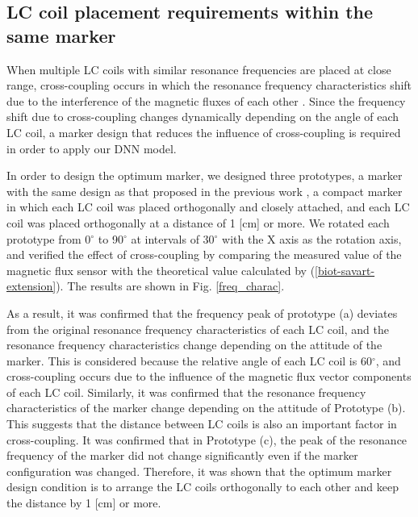 \documentclass[journal,twoside,web]{ieeecolor}
\begin{document}
\subsection{LC coil placement requirements within the same marker}
When multiple LC coils with similar resonance frequencies are placed at close range, cross-coupling occurs in which the resonance frequency characteristics shift due to the interference of the magnetic fluxes of each other \cite {cross-coupling, cross-coupling2}. Since the frequency shift due to cross-coupling changes dynamically depending on the angle of each LC coil, a marker design that reduces the influence of cross-coupling is required in order to apply our DNN model.

In order to design the optimum marker, we designed three prototypes, a marker with the same design as that proposed in the previous work \cite {im6d}, a compact marker in which each LC coil was placed orthogonally and closely attached, and each LC coil was placed orthogonally at a distance of 1 [cm] or more. We rotated each prototype from 0$^\circ$ to 90$^\circ$ at intervals of 30$^\circ$ with the X axis as the rotation axis, and verified the effect of cross-coupling by comparing the measured value of the magnetic flux sensor with the theoretical value calculated by (\ref{biot-savart-extension}).
The results are shown in Fig. \ref{freq_charac}.

As a result, it was confirmed that the frequency peak of prototype (a) deviates from the original resonance frequency characteristics of each LC coil, and the resonance frequency characteristics change depending on the attitude of the marker. This is considered because the relative angle of each LC coil is 60$^\circ$, and cross-coupling occurs due to the influence of the magnetic flux vector components of each LC coil.
Similarly, it was confirmed that the resonance frequency characteristics of the marker change depending on the attitude of Prototype (b). This suggests that the distance between LC coils is also an important factor in cross-coupling.
It was confirmed that in Prototype (c), the peak of the resonance frequency of the marker did not change significantly even if the marker configuration was changed. Therefore, it was shown that the optimum marker design condition is to arrange the LC coils orthogonally to each other and keep the distance by 1 [cm] or more.
\end{document}
